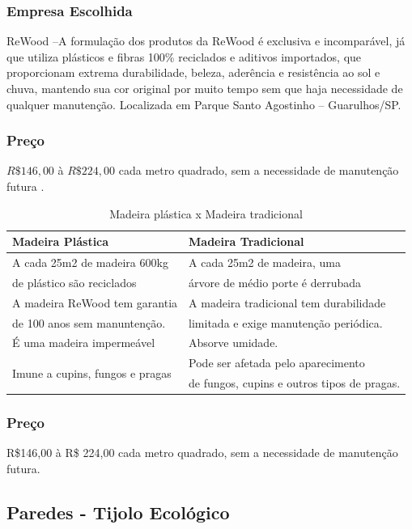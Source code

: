 \subsubsection*{\textbf{Empresa Escolhida}}

ReWood –A formulação dos produtos da ReWood é exclusiva e incomparável, já que utiliza plásticos e fibras 100\% reciclados e aditivos importados, que proporcionam extrema durabilidade, beleza, aderência e resistência ao sol e chuva, mantendo sua cor original por muito tempo sem que haja necessidade de qualquer manutenção. Localizada em Parque Santo Agostinho – Guarulhos/SP.

\subsubsection*{\textbf{Preço}}

	$R\$146,00$ à $R\$ 224,00$ cada metro quadrado, sem a necessidade de manutenção futura \cite{BlogReWood}.

\begin{table}[H]
\centering
\begin{tabular}{|l|l|}
\hline 
Madeira Plástica & Madeira Tradicional\tabularnewline
\hline 
\hline 
A cada 25m2 de madeira 600kg & A cada 25m2 de madeira, uma \tabularnewline
de plástico são reciclados & árvore de médio porte é derrubada\tabularnewline
\hline 
A madeira ReWood tem garantia & A madeira tradicional tem durabilidade \tabularnewline
de 100 anos sem manuntenção.  & limitada e exige manutenção periódica. \tabularnewline
\hline 
É uma madeira impermeável  & Absorve umidade. \tabularnewline
\hline 
\multirow{2}{*}{Imune a cupins, fungos e pragas } & Pode ser afetada pelo aparecimento \tabularnewline
 & de fungos, cupins e outros tipos de pragas. \tabularnewline
\hline 
\end{tabular}
\caption{Madeira plástica x Madeira tradicional}
\end{table}

\subsubsection{Preço}
 
R\$146,00 à R\$ 224,00 cada metro quadrado, sem a necessidade de manutenção futura.

\subsection{Paredes - Tijolo Ecológico }


